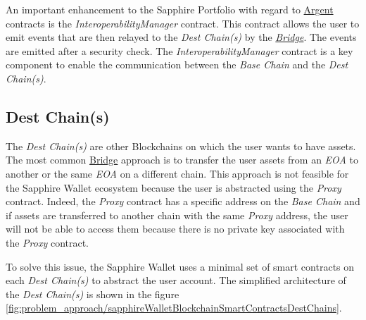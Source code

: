 
An important enhancement to the Sapphire Portfolio with regard to  \hyperref[subsec:argent]{Argent} contracts is the \textit{InteroperabilityManager} contract. This contract allows the user to emit events that are then relayed to the \textit{Dest Chain(s)} by the \hyperref[sec:bridge]{\textit{Bridge}}. The events are emitted after a security check. The \textit{InteroperabilityManager} contract is a key component to enable the communication between the \textit{Base Chain} and the \textit{Dest Chain(s)}.

\subsection{Dest Chain(s)}
\label{subsec:dest_chain(s)} 

The \textit{Dest Chain(s)} are other Blockchains on which the user wants to have assets. The most common \hyperref[subsec:bridge_classification]{Bridge} approach is to transfer the user assets from an \textit{EOA} to another or the same \textit{EOA} on a different chain. This approach is not feasible for the Sapphire Wallet ecosystem because the user is abstracted using the \textit{Proxy} contract. Indeed, the \textit{Proxy} contract has a specific address on the \textit{Base Chain} and if assets are transferred to another chain with the same \textit{Proxy} address, the user will not be able to access them because there is no private key associated with the \textit{Proxy} contract.

To solve this issue, the Sapphire Wallet uses a minimal set of smart contracts on each \textit{Dest Chain(s)} to abstract the user account. The simplified architecture of the \textit{Dest Chain(s)} is shown in the figure \ref{fig:problem_approach/sapphireWalletBlockchainSmartContractsDestChains}.


